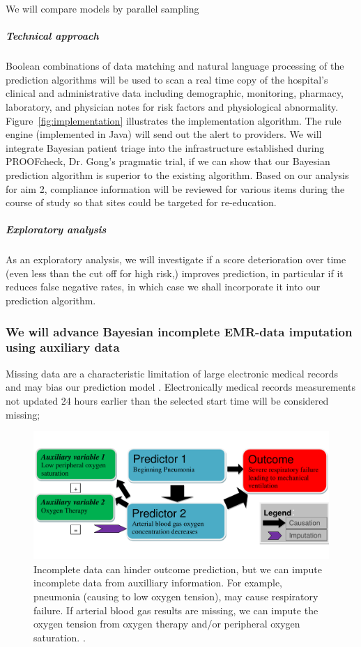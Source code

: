 \documentclass[11pt,notitlepage]{article}
\begin{document}
We will compare models by parallel sampling \cite{Congdon_modelcomparison_2005}

\subparagraph*{Technical approach}
Boolean combinations of data matching and natural language processing of the prediction algorithms will be used to scan a real time copy of the hospital's clinical and administrative data including demographic, monitoring, pharmacy, laboratory, and physician notes for risk factors and physiological abnormality. Figure~\ref{fig:implementation} illustrates the implementation algorithm. The rule engine (implemented in Java) will send out the alert to providers.
We will integrate Bayesian patient triage into the infrastructure established during PROOFcheck, Dr. Gong's pragmatic trial, if we can show that our Bayesian prediction algorithm is superior to the existing algorithm. Based on our analysis for aim 2, compliance information will be reviewed for various items during the course of study so that sites could be targeted for re-education.

\subparagraph{Exploratory analysis}
As an exploratory analysis, we will investigate if a score deterioration over time (even less than the cut off for high risk,) improves prediction, in particular if it reduces false negative rates, in which case we shall incorporate it into our prediction algorithm.

\subsubsection*{We will advance Bayesian incomplete EMR-data imputation using auxiliary data}
Missing data are a characteristic limitation of large electronic medical records and may bias our prediction model \cite{Dean_19279318}. Electronically medical records measurements not updated 24 hours earlier than the selected start time will be considered missing;  


\begin{figure} 
 \vspace{-30pt}
 \includegraphics[scale=0.4]{Figures/Bayesian_imputation.pdf}
    \vspace{-20pt}
  \caption{\footnotesize Incomplete data can hinder outcome prediction, but we can impute incomplete data from auxilliary information. For example, pneumonia (causing to low oxygen tension), may cause respiratory failure. If arterial blood gas results are missing, we can impute the oxygen tension from oxygen therapy and/or peripheral oxygen saturation. \cite{Hall_25389642}.}
   \vspace{-20pt}
    \label{fig:Imputation_fig}
\end{figure}
\end{document}
